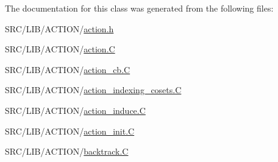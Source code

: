 The documentation for this class was generated from the following files\+:\begin{DoxyCompactItemize}
\item 
S\+R\+C/\+L\+I\+B/\+A\+C\+T\+I\+O\+N/\mbox{\hyperlink{action_8h}{action.\+h}}\item 
S\+R\+C/\+L\+I\+B/\+A\+C\+T\+I\+O\+N/\mbox{\hyperlink{action_8_c}{action.\+C}}\item 
S\+R\+C/\+L\+I\+B/\+A\+C\+T\+I\+O\+N/\mbox{\hyperlink{action__cb_8_c}{action\+\_\+cb.\+C}}\item 
S\+R\+C/\+L\+I\+B/\+A\+C\+T\+I\+O\+N/\mbox{\hyperlink{action__indexing__cosets_8_c}{action\+\_\+indexing\+\_\+cosets.\+C}}\item 
S\+R\+C/\+L\+I\+B/\+A\+C\+T\+I\+O\+N/\mbox{\hyperlink{action__induce_8_c}{action\+\_\+induce.\+C}}\item 
S\+R\+C/\+L\+I\+B/\+A\+C\+T\+I\+O\+N/\mbox{\hyperlink{action__init_8_c}{action\+\_\+init.\+C}}\item 
S\+R\+C/\+L\+I\+B/\+A\+C\+T\+I\+O\+N/\mbox{\hyperlink{backtrack_8_c}{backtrack.\+C}}\end{DoxyCompactItemize}
